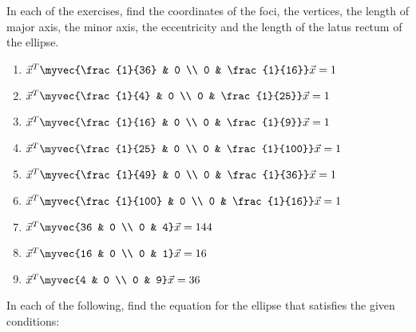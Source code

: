 %
\item In each of the exercises, find the coordinates of the foci, the vertices, the length of major axis, the minor axis, the eccentricity and the length of the latus rectum of the ellipse.
%
\begin{enumerate}
\item 
$
\vec{x}^T\myvec{\frac{1}{36} & 0 \\ 0 & \frac{1}{16}}\vec{x} = 1
$
\item 
$
\vec{x}^T\myvec{\frac{1}{4} & 0 \\ 0 & \frac{1}{25}}\vec{x} = 1
$
\item 
$
\vec{x}^T\myvec{\frac{1}{16} & 0 \\ 0 & \frac{1}{9}}\vec{x} = 1
$
\item 
$
\vec{x}^T\myvec{\frac{1}{25} & 0 \\ 0 & \frac{1}{100}}\vec{x} = 1
$
\item 
$
\vec{x}^T\myvec{\frac{1}{49} & 0 \\ 0 & \frac{1}{36}}\vec{x} = 1
$
\item 
$
\vec{x}^T\myvec{\frac{1}{100} & 0 \\ 0 & \frac{1}{16}}\vec{x} = 1
$
%
\item 
$
\vec{x}^T\myvec{36 & 0 \\ 0 & 4}\vec{x} = 144
$
%
\item 
$
\vec{x}^T\myvec{16 & 0 \\ 0 & 1}\vec{x} = 16
$
%
\item 
$
\vec{x}^T\myvec{4 & 0 \\ 0 & 9}\vec{x} = 36
$
%
\end{enumerate}
%
\item In each of the following, find the equation for the ellipse that satisfies the given conditions:
%

